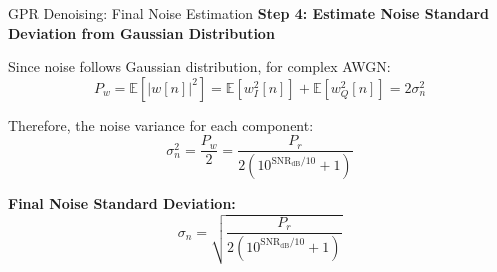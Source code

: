 \documentclass[aspectratio=169]{beamer}
\begin{document}
\begin{frame}{GPR Denoising: Final Noise Estimation}
\textbf{Step 4: Estimate Noise Standard Deviation from Gaussian Distribution}

Since noise follows Gaussian distribution, for complex AWGN:
\begin{equation}
P_w = \mathbb{E}[|w[n]|^2] = \mathbb{E}[w_I^2[n]] + \mathbb{E}[w_Q^2[n]] = 2\sigma_n^2
\end{equation}

Therefore, the noise variance for each component:
\begin{equation}
\sigma_n^2 = \frac{P_w}{2} = \frac{P_r}{2(10^{\text{SNR}_{\text{dB}}/10} + 1)}
\end{equation}

\vspace{0.1cm}
\textbf{Final Noise Standard Deviation:}
\begin{equation}
\boxed{\sigma_n = \sqrt{\frac{P_r}{2(10^{\text{SNR}_{\text{dB}}/10} + 1)}}}
\end{equation}

\begin{center}
\end{center}
\end{frame}
\end{document}
